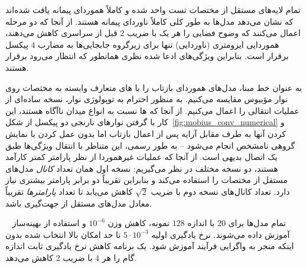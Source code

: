 تمام لایه‌های مستقل از مختصات تست واحد شده و کاملاً هموردای پیمانه یافت شده‌اند که نشان می‌دهد مدل‌ها به طور کلی کاملاً ناوردای پیمانه هستند.
از آنجا که دو مرحله  اعمال می‌کنند که وضوح فضایی را هر یک با ضریب $2$ قبل از  سراسری کاهش می‌دهند، هموردایی ایزومتری (ناوردایی) تنها برای زیرگروه جابجایی‌ها به مضارب $4$ پیکسل برقرار است.
بنابراین ویژگی‌های ادعا شده نظری همانطور که انتظار می‌رود برقرار هستند.

به عنوان خط مبنا، مدل‌های هموردای بازتاب را با های متعارف وابسته به مختصات روی نوار مؤبیوس مقایسه می‌کنیم.
به منظور احترام به توپولوژی نوار، نسخه ساده‌ای از عملیات  انتقالی را اعمال می‌کنیم.
از آنجا که ها نسبت به انواع میدان ناآگاه هستند، این کار با گرفتن نوارهای نارنجی دو پیکسل از شکل~\ref{fig:mobius_conv_numerical} و  کردن آنها به طرف مقابل آرایه پس از اعمال بازتاب اما بدون عمل کردن با نمایش گروهی نامشخص انجام می‌شود -- به طور رسمی، این متناظر با انتقال ویژگی‌ها طبق یک اتصال بدیهی است.
از آنجا که عملیات غیرهموردا از نظر پارامتر کمتر کارآمد هستند، دو نسخه مختلف در نظر می‌گیریم:
نسخه اول همان تعداد \emph{کانال} مدل‌های مستقل از مختصات را استفاده می‌کند و بنابراین تقریباً دو برابر پارامتر بیشتری نیاز دارد.
تعداد کانال‌های نسخه دوم با ضریب $\sqrt{2}$ کاهش می‌یابد تا تعداد \emph{پارامترها} تقریباً معادل مدل‌های مستقل از جهت‌گیری باشد.

تمام مدل‌ها برای $20$  با اندازه  $128$ نمونه، کاهش وزن $10^{-6}$ و استفاده از بهینه‌ساز ~\cite{Kingma2015-yq} آموزش داده می‌شوند.
نرخ یادگیری اولیه $5\cdot10^{-3}$ تا حد امکان بالا انتخاب شده بدون اینکه منجر به واگرایی فرآیند آموزش شود.
یک برنامه کاهش نرخ یادگیری ثابت اندازه گام را هر $4$  با ضریب $2$ کاهش می‌دهد.

